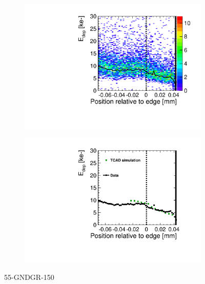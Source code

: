 \begin{figure}[htbp]
  \centering
  \begin{subfigure}[b]{0.5\linewidth}
    \includegraphics[width=\textwidth]{figures/ActiveEdge/TCAD_data_Edep_55_GNDGR_150.pdf}
    \caption{}
  \end{subfigure}\hfill
  \begin{subfigure}[b]{0.5\linewidth}
    \includegraphics[width=\textwidth]{figures/ActiveEdge/TCAD_data_55_GNDGR_150.pdf}
    \caption{}
  \end{subfigure}
  \caption{55-GNDGR-150}
  \label{fig:TCAD_vs_data_55_GNDGR_150}
\end{figure}





